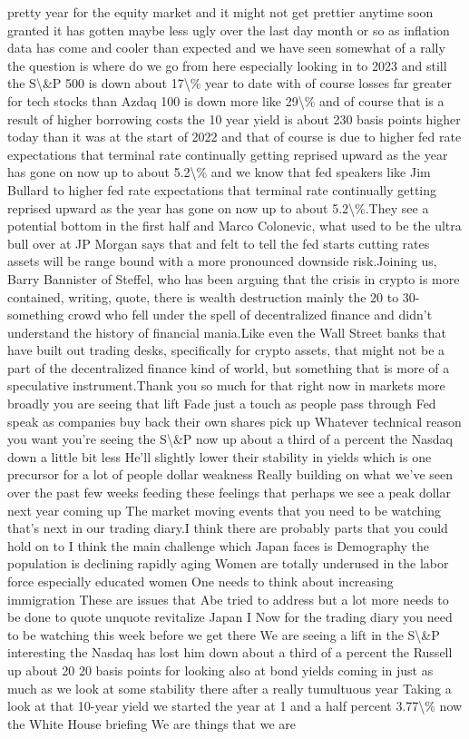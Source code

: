 \documentclass{article}%
\begin{document}
pretty year for the equity market and it might not get prettier anytime soon granted it has gotten maybe less ugly over the last day month or so as inflation data has come and cooler than expected and we have seen somewhat of a rally the question is where do we go from here especially looking in to 2023 and still the S\textbackslash{}\&P 500 is down about 17\textbackslash{}\% year to date with of course losses far greater for tech stocks than Azdaq 100 is down more like 29\textbackslash{}\% and of course that is a result of higher borrowing costs the 10 year yield is about 230 basis points higher today than it was at the start of 2022 and that of course is due to higher fed rate expectations that terminal rate continually getting reprised upward as the year has gone on now up to about 5.2\textbackslash{}\% and we know that fed speakers like Jim Bullard  to higher fed rate expectations that terminal rate continually getting reprised upward as the year has gone on now up to about 5.2\textbackslash{}\%.They see a potential bottom in the first half and Marco Colonevic, what used to be the ultra bull over at JP Morgan says that and felt to tell the fed starts cutting rates assets will be range bound with a more pronounced downside risk.Joining us, Barry Bannister of Steffel, who has been arguing that the crisis in crypto is more contained, writing, quote, there is wealth destruction mainly the 20 to 30{-}something crowd who fell under the spell of decentralized finance and didn't understand the history of financial mania.Like even the Wall Street banks that have built out trading desks, specifically for crypto assets, that might not be a part of the decentralized finance kind of world, but something that is more of a speculative instrument.Thank you so much for that right now in markets more broadly you are seeing that lift Fade just a touch as people pass through Fed speak as companies buy back their own shares pick up Whatever technical reason you want you're seeing the S\textbackslash{}\&P now up about a third of a percent the Nasdaq down a little bit less He'll slightly lower their stability in yields which is one precursor for a lot of people dollar weakness Really building on what we've seen over the past few weeks feeding these feelings that perhaps we see a peak dollar next year coming up The market moving events that you need to be watching that's next in our trading diary.I think there are probably parts that you could hold on to I think the main challenge which Japan faces is Demography the population is declining rapidly aging Women are totally underused in the labor force especially educated women One needs to think about increasing immigration These are issues that Abe tried to address but a lot more needs to be done to quote unquote revitalize Japan I Now for the trading diary you need to be watching this week before we get there We are seeing a lift in the S\textbackslash{}\&P interesting the Nasdaq has lost him down about a third of a percent the Russell up about 20 20 basis points for looking also at bond yields coming in just as much as we look at some stability there after a really tumultuous year Taking a look at that 10{-}year yield we started the year at 1 and a half percent 3.77\textbackslash{}\% now the White House briefing We are things that we are 
\end{document}
